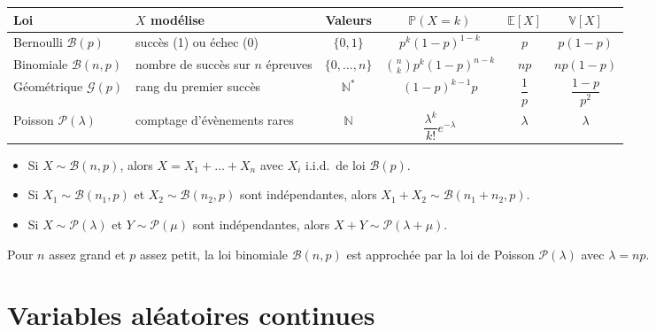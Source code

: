 \documentclass[11pt,a4paper]{article}
\newcommand{\E}{\mathbb{E}}
\newcommand{\V}{\mathbb{V}}
\renewcommand{\P}{\mathbb{P}}
\newcommand{\N}{\mathbb{N}}
\newcommand{\1}{\mathbf{1}}
\begin{document}
\begin{center}
\small
\begin{tabular}{@{}llcccc@{}}
\toprule
\textbf{Loi} & \textbf{$X$ modélise} & \textbf{Valeurs} & $\P(X=k)$ & $\E[X]$ & $\V[X]$\\
\midrule
Bernoulli $\mathcal{B}(p)$ & succès (1) ou échec (0) & $\{0,1\}$ & $p^k(1-p)^{1-k}$ & $p$ & $p(1-p)$\\[3pt]
Binomiale $\mathcal{B}(n,p)$ & nombre de succès sur $n$ épreuves & $\{0,\dots,n\}$ & $\binom{n}{k}p^k(1-p)^{n-k}$ & $np$ & $np(1-p)$\\[3pt]
Géométrique $\mathcal{G}(p)$ & rang du premier succès & $\N^*$ & $(1-p)^{k-1}p$ & $\dfrac1p$ & $\dfrac{1-p}{p^2}$\\[6pt]
Poisson $\mathcal{P}(\lambda)$ & comptage d'évènements rares & $\N$ & $\dfrac{\lambda^k}{k!}e^{-\lambda}$ & $\lambda$ & $\lambda$\\
\bottomrule
\end{tabular}
\end{center}

\begin{proposition}
\begin{itemize}
  \item Si $X\sim\mathcal{B}(n,p)$, alors $X=X_1+\dots+X_n$ avec $X_i$ i.i.d.\ de loi $\mathcal{B}(p)$.
  \item Si $X_1\sim\mathcal{B}(n_1,p)$ et $X_2\sim\mathcal{B}(n_2,p)$ sont indépendantes, alors $X_1+X_2\sim\mathcal{B}(n_1+n_2,p)$.
  \item Si $X\sim\mathcal{P}(\lambda)$ et $Y\sim\mathcal{P}(\mu)$ sont indépendantes, alors $X+Y\sim\mathcal{P}(\lambda+\mu)$.
\end{itemize}
\end{proposition}

\begin{theoreme}
Pour $n$ assez grand et $p$ assez petit, la loi binomiale $\mathcal{B}(n,p)$ est approchée par la loi de Poisson $\mathcal{P}(\lambda)$ avec $\lambda=np$.
\end{theoreme}

\section{Variables aléatoires continues}
\end{document}
